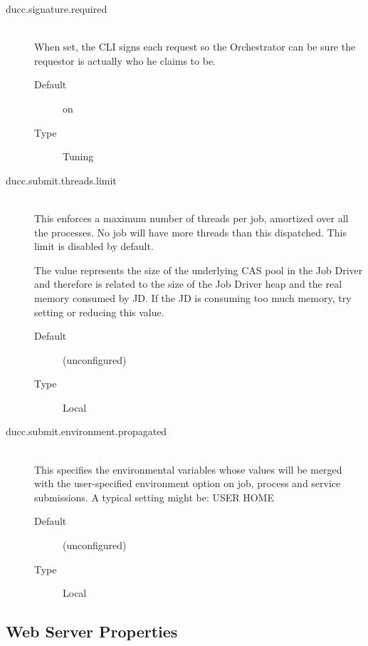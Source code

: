 \begin{description}
        \item[ducc.signature.required] \hfill \\
          When set, the CLI signs each request so the Orchestrator can be sure the requestor is 
          actually who he claims to be. 
          \begin{description}            
            \item[Default] on             
            \item[Type] Tuning 
          \end{description}


       \item[ducc.submit.threads.limit] \hfill \\
         This enforces a maximum number of threads per job, amortized over all the processes. No 
         job will have more threads than this dispatched. This limit is disabled by default. 

         The value represents the size of the underlying CAS pool in the Job Driver and therefore
         is related to the size of the Job Driver heap and the real memory consumed by JD.  If
         the JD is consuming too much memory, try setting or reducing this value.
         
         \begin{description}
           \item[Default] (unconfigured) 
           \item[Type] Local 
         \end{description}

       \item[ducc.submit.environment.propagated] \hfill \\
         This specifies the environmental variables whose values will be merged with the
         user-specified environment option on job, process and service submissions.  A typical setting
         might be: USER HOME

         \begin{description}
           \item[Default] (unconfigured) 
           \item[Type] Local 
         \end{description}
                                                                        
      \end{description}  
        

\subsection{Web Server Properties}

